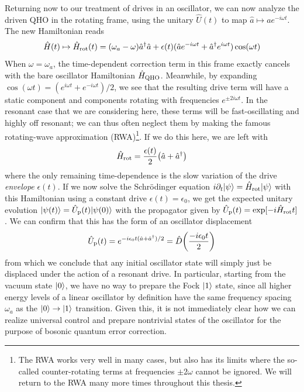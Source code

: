 Returning now to our treatment of drives in an oscillator, we can now analyze the driven QHO in the rotating frame, using the unitary $\hat{U}(t)$ to map $\hat{a} \mapsto a e^{-i\omega t}$. The new Hamiltonian reads 
\begin{equation}
    \hat{H}(t) \mapsto \hat{H}_{\rm rot}(t) = (\omega_a - \omega)\hat{a}^\dagger \hat{a} + \epsilon(t)(\hat{a} e^{-i\omega t} + \hat{a}^\dagger e^{i\omega t})\cos(\omega t)
\end{equation}
When $\omega = \omega_a$, the time-dependent correction term in this frame exactly cancels with the bare oscillator Hamiltonian $\hat{H}_{\rm QHO}$. Meanwhile, by expanding $\cos(\omega t) = (e^{i\omega t} + e^{-i\omega t})/2$, we see that the resulting drive term will have a static component and components rotating with frequencies $e^{\pm 2i\omega t}$. In the resonant case that we are considering here, these terms will be fast-oscillating and highly off resonant; we can thus often neglect them by making the famous rotating-wave approximation (RWA)\footnote{The RWA works very well in many cases, but also has its limits where the so-called counter-rotating terms at frequencies $\pm 2\omega$ cannot be ignored. We will return to the RWA many more times throughout this thesis.}. If we do this here, we are left with
\begin{equation}
    \hat{H}_{\rm rot} = \frac{\epsilon(t)}{2} \big(\hat{a} + \hat{a}^\dagger\big)
\end{equation}
where the only remaining time-dependence is the slow variation of the drive \textit{envelope} $\epsilon(t)$. If we now solve the Schr\"odinger equation $i\partial_t \lvert\psi\rangle = \hat{H}_{\rm rot}\lvert\psi\rangle$ with this Hamiltonian using a constant drive $\epsilon(t) = \epsilon_0$, we get the expected unitary evolution $\lvert\psi(t)\rangle = \hat{U}_{\rm p}(t) \lvert\psi(0)\rangle$ with the propagator given by $\hat{U}_{\rm p}(t) = \exp[-i\hat{H}_{\rm rot} t]$. We can confirm that this has the form of an oscillator displacement
\begin{equation}
    \hat{U}_{\rm p}(t) = e^{-i\epsilon_0 t(\hat{a} + \hat{a}^\dagger)/2} = \hat{D}\bigg(\frac{-i\epsilon_0 t}{2}\bigg)
\end{equation}
from which we conclude that any initial oscillator state will simply just be displaced under the action of a resonant drive. In particular, starting from the vacuum state $\lvert0\rangle$, we have no way to prepare the Fock $\lvert1\rangle$ state, since all higher energy levels of a linear oscillator by definition have the same frequency spacing $\omega_a$ as the $\lvert0\rangle\to\lvert1\rangle$ transition. Given this, it is not immediately clear how we can realize universal control and prepare nontrivial states of the oscillator for the purpose of bosonic quantum error correction.

